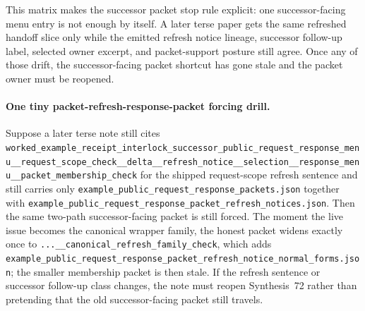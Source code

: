 \documentclass[11pt]{article}
\begin{document}
This matrix makes the successor packet stop rule explicit: one successor-facing menu entry is not enough by itself. A later terse paper gets the same refreshed handoff slice only while the emitted refresh notice lineage, successor follow-up label, selected owner excerpt, and packet-support posture still agree. Once any of those drift, the successor-facing packet shortcut has gone stale and the packet owner must be reopened.\cite{series:workedexample}

\paragraph{One tiny packet-refresh-response-packet forcing drill.}
Suppose a later terse note still cites \nolinkurl{worked_example_receipt_interlock_successor_public_request_response_menu__request_scope_check__delta__refresh_notice__selection__response_menu__packet_membership_check} for the shipped request-scope refresh sentence and still carries only \nolinkurl{example_public_request_response_packets.json} together with \nolinkurl{example_public_request_response_packet_refresh_notices.json}. Then the same two-path successor-facing packet is still forced. The moment the live issue becomes the canonical wrapper family, the honest packet widens exactly once to \nolinkurl{...__canonical_refresh_family_check}, which adds \nolinkurl{example_public_request_response_packet_refresh_notice_normal_forms.json}; the smaller membership packet is then stale. If the refresh sentence or successor follow-up class changes, the note must reopen Synthesis~72 rather than pretending that the old successor-facing packet still travels.\cite{series:workedexample}
\end{document}
